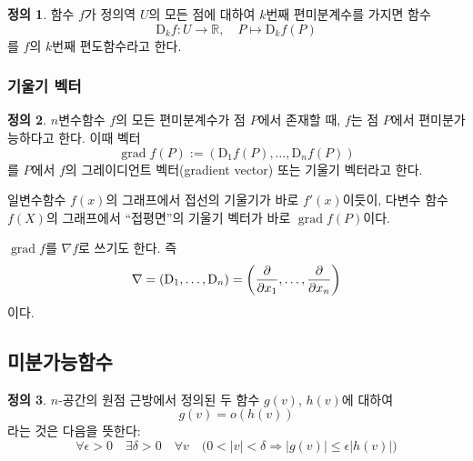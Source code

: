 \documentclass[unfonts,oneside,a4paper]{oblivoir}
\theoremstyle{definition}
\newtheorem{definition}{정의}[subsubsection]
\theoremstyle{theorem}
\renewcommand{\vec}[1]{\bm{\mathit{#1}}}
\newcommand{\dD}{\mathrm{D}}
\DeclareMathOperator{\grad}{grad}
\begin{document}
\begin{definition}
    함수 $f$가 정의역 $U$의 모든 점에 대하여 $k$번째 편미분계수를 가지면 함수
    \begin{equation*}
        \dD_k f: U \rightarrow \mathbb R,\quad P \mapsto \dD_k f(P)
    \end{equation*}
    를 $f$의 $k$번째 편도함수라고 한다.
\end{definition}

\subsubsection{기울기 벡터}

\begin{definition}
    $n$변수함수 $f$의 모든 편미분계수가 점 $P$에서 존재할 때, $f$는 점 $P$에서 편미분가능하다고 한다.
    이때 벡터
    \begin{equation*}
        \grad f(P) := (\dD_1 f(P), \dots, \dD_n f(P))
    \end{equation*}
    를 $P$에서 $f$의 그레이디언트 벡터(gradient vector) 또는 기울기 벡터라고 한다.

    일변수함수 $f(x)$의 그래프에서 접선의 기울기가 바로 $f'(x)$이듯이, 다변수 함수 $f(X)$의 그래프에서 ``접평면''의 기울기 벡터가 바로 $\grad f(P)$이다.

    $\grad f$를 $\nabla f$로 쓰기도 한다.
    즉
    \begin{equation*}
        \nabla = (\dD_1, \dots, \dD_n) = \left(\diffp*{}{x_1}, \dots, \diffp*{}{x_n}\right)
    \end{equation*}
    이다.
\end{definition}

\subsection{미분가능함수}

\begin{definition}
    $n$-공간의 원점 근방에서 정의된 두 함수 $g(\vec v)$, $h(\vec v)$에 대하여
    \begin{equation*}
        g(\vec v) = o(h(\vec v))
    \end{equation*}
    라는 것은 다음을 뜻한다:
    \begin{equation*}
        \forall \epsilon > 0 \quad \exists \delta > 0 \quad \forall \vec v \quad \bigl(0 < |\vec v| < \delta \Rightarrow |g(\vec v)| \leq \epsilon |h(\vec v)|\bigr)
    \end{equation*}
\end{definition}
\end{document}
